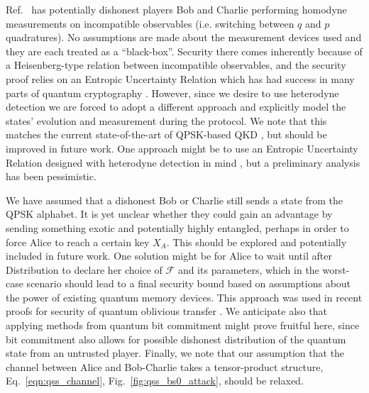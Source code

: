 Ref.~\cite{Kogias2017} has potentially dishonest players Bob and Charlie performing homodyne measurements on incompatible observables (i.e. switching between $q$ and $p$ quadratures). No assumptions are made about the measurement devices used and they are each treated as a ``black-box''. Security there comes inherently because of a Heisenberg-type relation between incompatible observables, and the security proof relies on an Entropic Uncertainty Relation which has had success in many parts of quantum cryptography \cite{Furrer2012, Furrer2017}. However, since we desire to use heterodyne detection we are forced to adopt a different approach and explicitly model the states' evolution and measurement during the protocol. We note that this matches the current state-of-the-art of QPSK-based QKD \cite{Papanastasiou2018}, but should be improved in future work. One approach might be to use an Entropic Uncertainty Relation designed with heterodyne detection in mind \cite{DePalma2017i, DePalma2017}, but a preliminary analysis has been pessimistic.

We have assumed that a dishonest Bob or Charlie still sends a state from the QPSK alphabet. It is yet unclear whether they could gain an advantage by sending something exotic and potentially highly entangled, perhaps in order to force Alice to reach a certain key $X_A$. This should be explored and potentially included in future work. One solution might be for Alice to wait until after Distribution to declare her choice of $\mathcal{F}$ and its parameters, which in the worst-case scenario should lead to a final security bound based on assumptions about the power of existing quantum memory devices. This approach was used in recent proofs for security of quantum oblivious transfer \cite{Furrer2017, Broadbent2015}. We anticipate also that applying methods from quantum bit commitment \cite{Broadbent2015} might prove fruitful here, since bit commitment also allows for possible dishonest distribution of the quantum state from an untrusted player. Finally, we note that our assumption that the channel between Alice and Bob-Charlie takes a tensor-product structure, Eq.~\ref{eqn:qss_channel}, Fig.~\ref{fig:qss_bs0_attack}, should be relaxed. %





